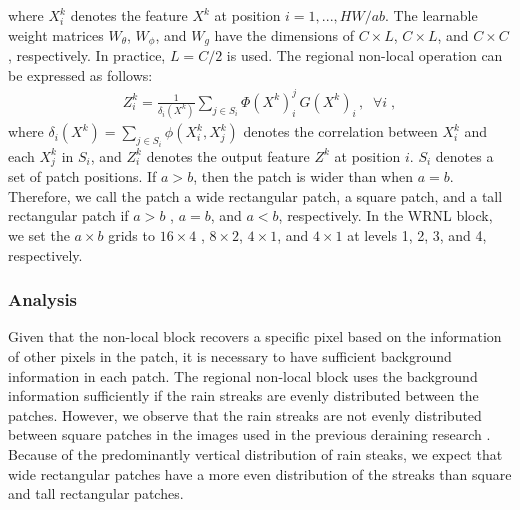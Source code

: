 \documentclass[a4paper,fleqn]{cas-dc}
\begin{document}
where $ {X}_{i}^{k}$ denotes the feature $X^{k}$ at position $i=1,...,HW/ab$. The learnable weight matrices ${W}_\theta$, ${W}_\phi$, and ${W}_g$ have the dimensions of $C \times L$, $C \times L$, and $ C \times C$, respectively. In practice,  $L = C/2$ is used. The regional non-local operation can be expressed as follows: 
\begin{align}  
\label{proposed}
{Z}_i^k = \frac{1}{\delta_i ({X^{k}})} \sum\nolimits_{j \in {S}_i} \Phi({X^{k}})_i^j \, {G} ({X^{k}})_i\,, \;\;\forall i\;,
\end{align}
where $\delta_i ({X^k}) = \sum\nolimits_{j \in {S}_i} \phi({X}_i^k, {X}_j^k)$ denotes the correlation between ${X}_i^k$ and each ${X}_j^k$ in ${S}_i$, and $Z_i^k$ denotes the output feature $Z^k$ at position $i$. ${S}_i$ denotes a set of patch positions. If $ a > b $, then the patch is wider than when $a=b$. Therefore, we call the patch a wide rectangular patch, a square patch, and a tall rectangular patch if $a > b$ , $a= b$, and $ a <b$, respectively. In the WRNL block, we set the $a \times b$ grids to $16 \times 4$ , $8 \times 2$, $4 \times 1$, and $4 \times 1$ at levels 1, 2, 3, and 4, respectively. 



\subsubsection{Analysis}
\label{analysis}




Given that the non-local block recovers a specific pixel based on the information of other pixels in the patch, it is necessary to have sufficient background information in each patch. The regional non-local block uses the background information sufficiently if the rain streaks are evenly distributed between the patches. However, we observe that the rain streaks are not evenly distributed between square patches in the images used in the previous deraining research \cite{li2018non,yu2019gradual}. Because of the predominantly vertical distribution of rain steaks, we expect that wide rectangular patches have a more even distribution of the streaks than square and tall rectangular patches. 
\end{document}

